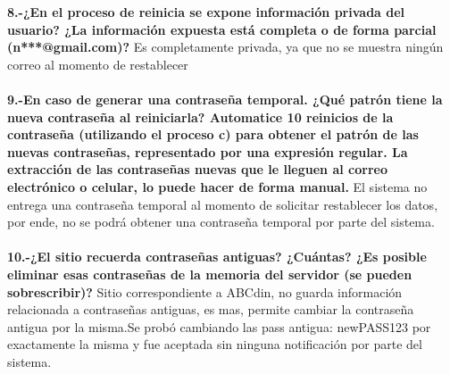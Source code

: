 \documentclass{article}
\begin{document}
\textbf{ 8.-¿En el proceso de reinicia se expone información privada del usuario? ¿La información expuesta está completa o de forma parcial (n***@gmail.com)?}
\newline
Es completamente privada, ya que no se muestra ningún correo al momento de restablecer
\\\\
\textbf{9.-En caso de generar una contraseña temporal. ¿Qué patrón tiene la nueva contraseña al reiniciarla? Automatice 10 reinicios de la contraseña (utilizando el proceso c) para obtener el patrón de las nuevas contraseñas, representado por una expresión regular. La extracción de las contraseñas nuevas que le lleguen al correo electrónico o celular, lo puede hacer de forma manual.}
\newline
El sistema no entrega una contraseña temporal al momento de solicitar restablecer los datos, por ende, no se podrá obtener una contraseña temporal por parte del sistema. 
\\\\
\textbf{10.-¿El sitio recuerda contraseñas antiguas? ¿Cuántas? ¿Es posible eliminar esas contraseñas de la memoria del servidor (se pueden sobrescribir)?}
Sitio correspondiente a ABCdin, no guarda información relacionada a contraseñas antiguas, es mas, permite cambiar la contraseña antigua por la misma.Se probó cambiando las pass antigua: newPASS123 por exactamente la misma y fue aceptada sin ninguna notificación por parte del sistema.

\\\\ \newline
\end{document}
